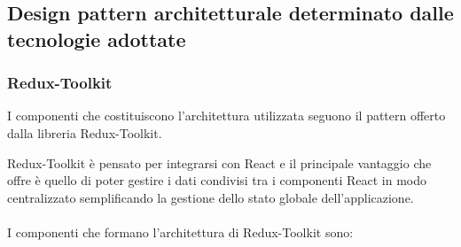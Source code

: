 \subsection{Design pattern architetturale determinato dalle tecnologie adottate}
\label{design Redux}

\subsubsection{Redux-Toolkit}
I componenti che costituiscono l'architettura utilizzata seguono il pattern offerto dalla libreria Redux-Toolkit.

Redux-Toolkit è pensato per integrarsi con React e il principale vantaggio che offre è quello di poter gestire i dati condivisi tra 
i componenti React in modo centralizzato semplificando la gestione dello stato globale dell'applicazione.
\\\\
I componenti che formano l'architettura di Redux-Toolkit sono:
